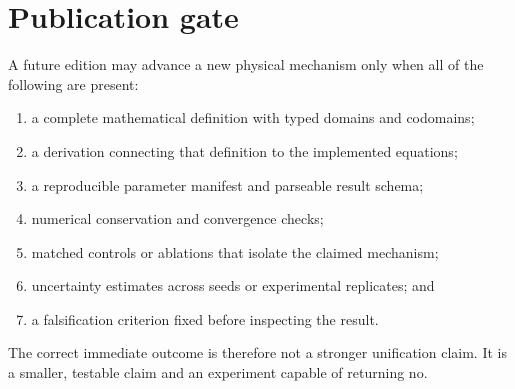 \section{Publication gate}

A future edition may advance a new physical mechanism only when all of the
following are present:

\begin{enumerate}
  \item a complete mathematical definition with typed domains and codomains;
  \item a derivation connecting that definition to the implemented equations;
  \item a reproducible parameter manifest and parseable result schema;
  \item numerical conservation and convergence checks;
  \item matched controls or ablations that isolate the claimed mechanism;
  \item uncertainty estimates across seeds or experimental replicates; and
  \item a falsification criterion fixed before inspecting the result.
\end{enumerate}

The correct immediate outcome is therefore not a stronger unification claim.
It is a smaller, testable claim and an experiment capable of returning no.
